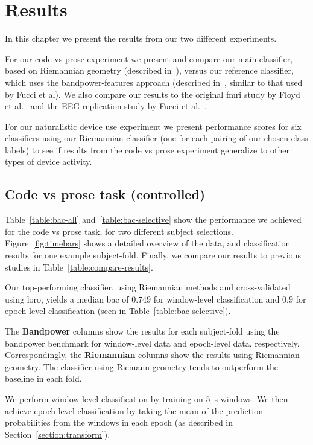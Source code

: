 \chapter{Results}\label{section:results}

    In this chapter we present the results from our two different experiments.

    For our code vs prose experiment we present and compare our main classifier, based on Riemannian geometry (described in~), versus our reference classifier, which uses the bandpower-features approach (described in~, similar to that used by Fucci et al). We also compare our results to the original \gls{fmri} study by Floyd et al.~\cite{floyd_decoding_2017} and the EEG replication study by Fucci et al.~\cite{fucci_replication_2019}. 

    For our naturalistic device use experiment we present performance scores for six classifiers using our Riemannian classifier (one for each pairing of our chosen class labels) to see if results from the code vs prose experiment generalize to other types of device activity.

    \pagebreak
    \section{Code vs prose task (controlled)}
        Table~\ref{table:bac-all} and~\ref{table:bac-selective} show the performance we achieved for the code vs prose task, for two different subject selections. Figure~\ref{fig:timebars} shows a detailed overview of the data, and classification results for one example subject-fold. Finally, we compare our results to previous studies in Table~\ref{table:compare-results}.

        Our top-performing classifier, using Riemannian methods and cross-validated using \gls{loro}, yields a median \gls{bac} of $0.749$  for window-level classification and $0.9$ for epoch-level classification (seen in Table~\ref{table:bac-selective}).

        The \textbf{Bandpower} columns show the results for each subject-fold using the bandpower benchmark for window-level data and epoch-level data, respectively. Correspondingly, the \textbf{Riemannian} columns show the results using Riemannian geometry. The classifier using Riemann geometry tends to outperform the baseline in each fold.

        We perform window-level classification by training on \SI{5}{\second} windows. We then achieve epoch-level classification by taking the mean of the prediction probabilities from the windows in each epoch (as described in Section~\ref{section:transform}).

